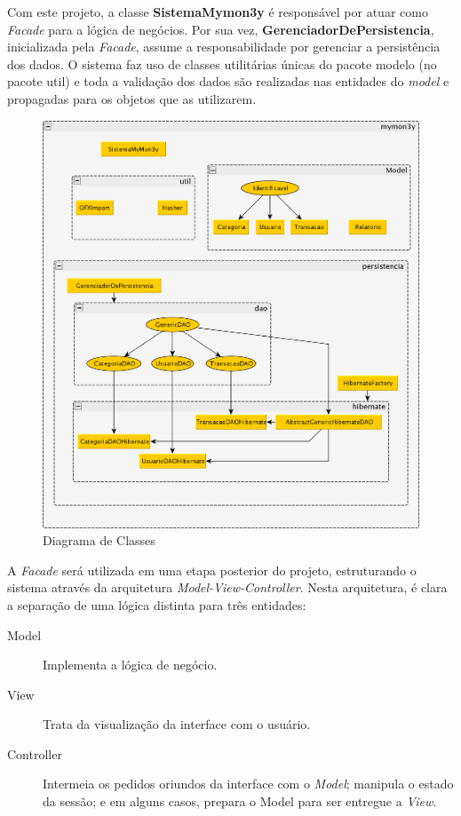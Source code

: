 \documentclass[12pt]{article}
\begin{document}
Com este projeto, a classe \textbf{SistemaMymon3y} é responsável por atuar como \textit{Facade} para a lógica de negócios. Por sua vez, \textbf{GerenciadorDePersistencia}, inicializada pela \textit{Facade}, assume a responsabilidade por gerenciar a persistência dos dados. O sistema faz uso de classes utilitárias únicas do pacote modelo (no pacote util) e toda a validação dos dados são realizadas nas entidades do \textit{model} e propagadas para os objetos que as utilizarem.

\begin{figure}[H]
\centering
  \label{arquitetura-fig}
  \includegraphics[scale=0.2, bb=0 0 1462 1583]{arquitetura.png}
  \caption{Diagrama de Classes}
\end{figure}

A \textit{Facade} será utilizada em uma etapa posterior do projeto, estruturando o sistema através da arquitetura \textit{Model-View-Controller}\cite{MVC}. Nesta arquitetura, é clara a separação de uma lógica distinta para três entidades:

\begin{description}
 \item[Model] Implementa a lógica de negócio.
 \item[View] Trata da visualização da interface com o usuário.
 \item[Controller] Intermeia os pedidos oriundos da interface com o \textit{Model}; manipula o estado da sessão; e em alguns casos, prepara o Model para ser entregue a \textit{View}.
 \end{description}
\end{document}
